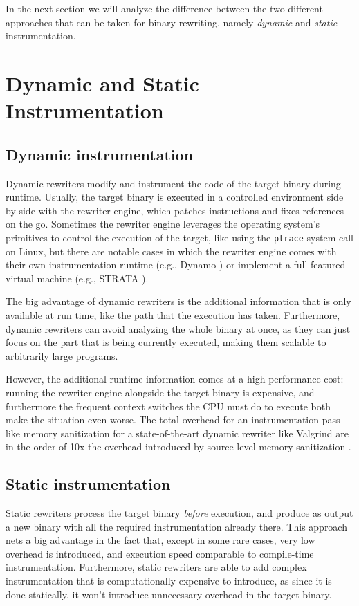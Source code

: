 \documentclass[a4paper,11pt,oneside]{report}
\begin{document}
In the next section we will analyze the difference between the two different 
approaches that can be taken for binary rewriting, namely \emph{dynamic} and 
\emph{static} instrumentation.




\section{Dynamic and Static Instrumentation}

\subsection{Dynamic instrumentation}
Dynamic rewriters modify and instrument the code of the target binary during 
runtime. Usually, the target binary is executed in a controlled environment 
side by side with the rewriter engine, which patches instructions and fixes 
references on the go. Sometimes the rewriter engine leverages the operating 
system's primitives to control the execution of the target, like using the 
\texttt{ptrace} system call on Linux, but there are notable cases in which the 
rewriter engine comes with their own instrumentation runtime (e.g., Dynamo 
\cite{dynamo}) or implement a full featured virtual machine (e.g., STRATA 
\cite{strata}).

The big advantage of dynamic rewriters is the additional information that is 
only available at run time, like the path that the execution has taken.  
Furthermore, dynamic rewriters can avoid analyzing the whole binary at once, as 
they can just focus on the part that is being currently executed, making them 
scalable to arbitrarily large programs.

However, the additional runtime information comes at a high performance cost: 
running the rewriter engine alongside the target binary is expensive, and 
furthermore the frequent context switches the CPU must do to execute both make 
the situation even worse. The total overhead for an instrumentation pass like 
memory sanitization for a state-of-the-art dynamic rewriter like Valgrind are 
in the order of 10x \cite{dinesh20oakland} the overhead introduced by 
source-level memory sanitization .

\subsection{Static instrumentation}
Static rewriters process the target binary \emph{before} execution, and produce 
as output a new binary with all the required instrumentation already there.  
This approach nets a big advantage in the fact that, except in some rare cases, 
very low overhead is introduced, and execution speed comparable to compile-time 
instrumentation. Furthermore, static rewriters are able to add complex 
instrumentation that is computationally expensive to introduce, as since it is 
done statically, it won't introduce unnecessary overhead in the target binary. 
\end{document}
